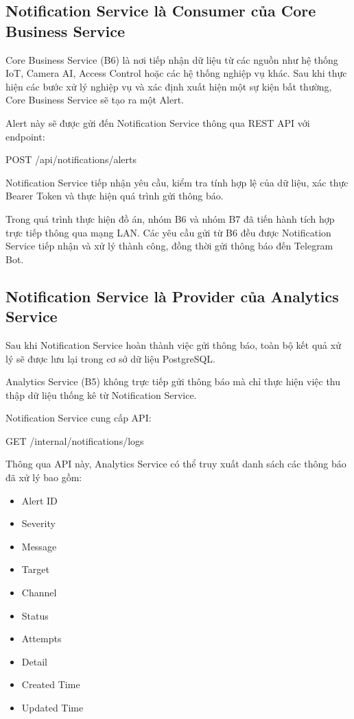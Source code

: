 \subsection{Notification Service là Consumer của Core Business Service}

Core Business Service (B6) là nơi tiếp nhận dữ liệu từ các nguồn như hệ thống IoT, Camera AI, Access Control hoặc các hệ thống nghiệp vụ khác. Sau khi thực hiện các bước xử lý nghiệp vụ và xác định xuất hiện một sự kiện bất thường, Core Business Service sẽ tạo ra một Alert.

Alert này sẽ được gửi đến Notification Service thông qua REST API với endpoint:

\begin{center}
POST /api/notifications/alerts
\end{center}

Notification Service tiếp nhận yêu cầu, kiểm tra tính hợp lệ của dữ liệu, xác thực Bearer Token và thực hiện quá trình gửi thông báo.

Trong quá trình thực hiện đồ án, nhóm B6 và nhóm B7 đã tiến hành tích hợp trực tiếp thông qua mạng LAN. Các yêu cầu gửi từ B6 đều được Notification Service tiếp nhận và xử lý thành công, đồng thời gửi thông báo đến Telegram Bot.

\subsection{Notification Service là Provider của Analytics Service}

Sau khi Notification Service hoàn thành việc gửi thông báo, toàn bộ kết quả xử lý sẽ được lưu lại trong cơ sở dữ liệu PostgreSQL.

Analytics Service (B5) không trực tiếp gửi thông báo mà chỉ thực hiện việc thu thập dữ liệu thống kê từ Notification Service.

Notification Service cung cấp API:

\begin{center}
GET /internal/notifications/logs
\end{center}

Thông qua API này, Analytics Service có thể truy xuất danh sách các thông báo đã xử lý bao gồm:

\begin{itemize}
\item Alert ID
\item Severity
\item Message
\item Target
\item Channel
\item Status
\item Attempts
\item Detail
\item Created Time
\item Updated Time
\end{itemize}

